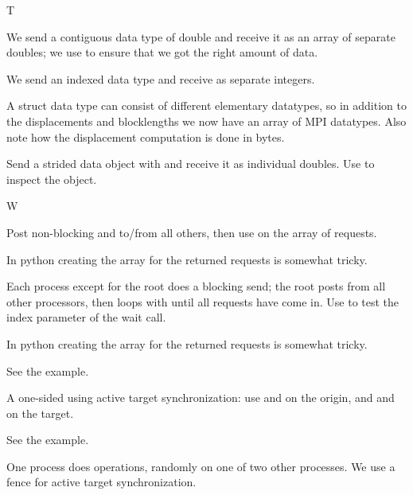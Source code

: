  {T}


We send a contiguous data type of double and receive it as an array of
separate doubles; we use  to ensure that
we got the right amount of data.
%


We send an indexed data type and receive as separate integers.
%
%


A struct data type can consist of different elementary datatypes, so
in addition to the displacements and blocklengths we now have an array
of MPI datatypes. Also note how the displacement computation is done
in bytes.
%


Send a strided data object with  and receive it as
individual doubles. Use  to inspect the
 object.
%

 {W}


Post non-blocking  and
 to/from all others, then use 
on the array of requests.
%

In python creating the array for the returned requests is somewhat
tricky.
%


Each process except for the root does a blocking send; the root
posts  from all other processors, then loops
with  until all requests have come in. Use
 to test the index parameter of the wait
call.
%

In python creating the array for the returned requests is somewhat
tricky.
%


See the  example.


A one-sided  using active target synchronization:
use  and 
on the origin, and  and
 on the target.
%


See the  example.


One process does  operations, randomly on one of
two other processes. We use a fence for active target synchronization.
%
